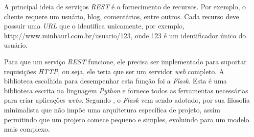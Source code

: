 A principal ideia de serviços \emph{REST} é o fornecimento de recursos. 
Por exemplo, o cliente requere um usuário, blog, comentários, entre outros. 
Cada recurso deve possuir uma \emph{URL} que o identifica unicamente, por exemplo, http://www.minhaurl.com.br/usuario/123, onde 123 é um identificador único do usuário.

Para que um serviço \emph{REST} funcione, ele precisa ser implementado para suportar requisições \emph{HTTP}, ou seja, ele teria que ser um servidor \emph{web} completo. 
A biblioteca escolhida para desempenhar esta função foi a \emph{Flask}. 
Esta é uma biblioteca escrita na linguagem \emph{Python} e fornece todos as ferramentas necessárias para criar aplicações \emph{webs}. 
Segundo , o \emph{Flask} vem sendo adotado, por sua filosofia minimalista que não impõe uma arquitetura específica de projeto, assim permitindo que um projeto comece pequeno e simples, evoluindo para um modelo mais complexo.

